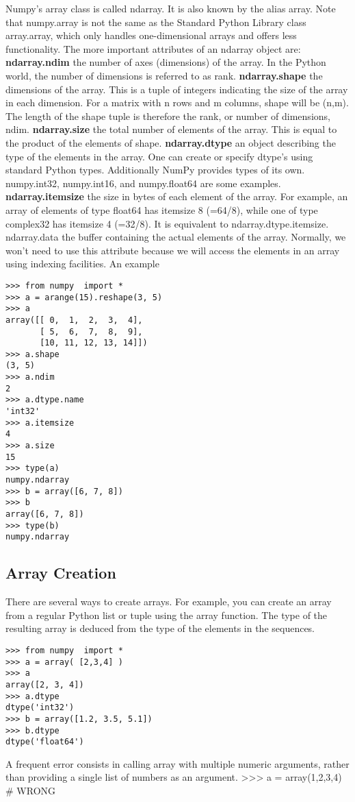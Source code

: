 Numpy's array class is called ndarray. It is also known by the alias array. Note that numpy.array is not the same as the Standard Python Library class array.array, which only handles one-dimensional arrays and offers less functionality. The more important attributes of an ndarray object are:
\textbf{ndarray.ndim}
the number of axes (dimensions) of the array. In the Python world, the number of dimensions is referred to as rank.
\textbf{ndarray.shape}
the dimensions of the array. This is a tuple of integers indicating the size of the array in each dimension. For a matrix with n rows and m columns, shape will be (n,m). The length of the shape tuple is therefore the rank, or number of dimensions, ndim.
\textbf{ndarray.size}
the total number of elements of the array. This is equal to the product of the elements of shape.
\textbf{ndarray.dtype}
an object describing the type of the elements in the array. One can create or specify dtype's using standard Python types. Additionally NumPy provides types of its own. numpy.int32, numpy.int16, and numpy.float64 are some examples.
\textbf{ndarray.itemsize}
the size in bytes of each element of the array. For example, an array of elements of type float64 has itemsize 8 (=64/8), while one of type complex32 has itemsize 4 (=32/8). It is equivalent to ndarray.dtype.itemsize.
ndarray.data
the buffer containing the actual elements of the array. Normally, we won't need to use this attribute because we will access the elements in an array using indexing facilities.
An example
\begin{verbatim}
>>> from numpy  import *
>>> a = arange(15).reshape(3, 5)
>>> a
array([[ 0,  1,  2,  3,  4],
       [ 5,  6,  7,  8,  9],
       [10, 11, 12, 13, 14]])
>>> a.shape
(3, 5)
>>> a.ndim
2
>>> a.dtype.name
'int32'
>>> a.itemsize
4
>>> a.size
15
>>> type(a)
numpy.ndarray
>>> b = array([6, 7, 8])
>>> b
array([6, 7, 8])
>>> type(b)
numpy.ndarray
\end{verbatim}
\subsection{Array Creation}
There are several ways to create arrays.
For example, you can create an array from a regular Python list or tuple using the array function. The type of the resulting array is deduced from the type of the elements in the sequences.
\begin{verbatim}
>>> from numpy  import *
>>> a = array( [2,3,4] )
>>> a
array([2, 3, 4])
>>> a.dtype
dtype('int32')
>>> b = array([1.2, 3.5, 5.1])
>>> b.dtype
dtype('float64')
\end{verbatim}
A frequent error consists in calling array with multiple numeric arguments, rather than providing a single list of numbers as an argument.
>>> a = array(1,2,3,4)    # WRONG


